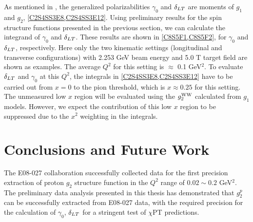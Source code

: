 
As mentioned in , the generalized polarizabilities $\gamma_0$ and $\delta_{LT}$ are moments of $g_1$ and $g_2$, \cref{C2S4SS3E8,C2S4SS3E12}. Using preliminary results for the spin structure functions presented in the previous section, we can calculate the integrand of $\gamma_0$ and $\delta_{LT}$. These results are shown in \cref{C8S5F1,C8S5F2}, for $\gamma_0$ and $\delta_{LT}$, respectively. Here only the two kinematic settings (longitudinal and transverse configurations) with 2.253 GeV beam energy and 5.0 T target field are shown as examples. The average $Q^2$ for this setting is $\approx$ 0.1 GeV${}^2$. To evaluate $\delta_{LT}$ and $\gamma_0$ at this $Q^2$, the integrals in \cref{C2S4SS3E8,C2S4SS3E12} have to be carried out from $x=0$ to the pion threshold, which is $x\approx0.25$ for this setting. The unmeasured low $x$ region will be evaluated using the $g_2^{\mathrm{WW}}$ calculated from $g_1$ models. However, we expect the contribution of this low $x$ region to be suppressed due to the $x^2$ weighting in the integrals.


\section{Conclusions and Future Work}
\label{C8S6}

The E08-027 collaboration successfully collected data for the first precision extraction of proton $g_2$ structure function in the $Q^2$ range of $0.02\sim0.2$ GeV${}^2$. The preliminary data analysis presented in this thesis has demonstrated that $g_2^p$ can be successfully extracted from E08-027 data, with the required precision for the calculation of $\gamma_0$, $\delta_{LT}$ for a stringent test of $\chi$PT predictions.

